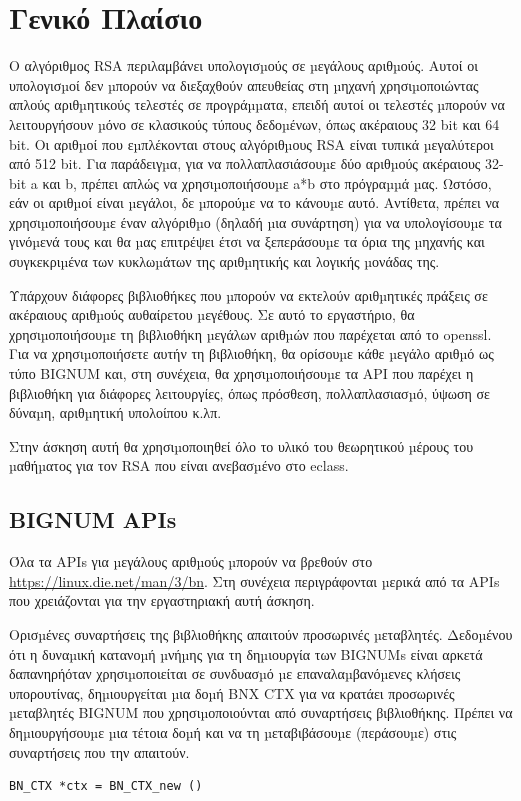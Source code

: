%
%
\setcounter{section}{1}
\section{Γενικό Πλαίσιο}


\noindent
Ο αλγόριθμος RSA περιλαμβάνει υπολογισµούς σε µεγάλους αριθµούς. Αυτοί οι υπολογισµοί
δεν µπορούν να διεξαχθούν απευθείας στη µηχανή χρησιµοποιώντας απλούς αριθµητικούς
τελεστές σε προγράµµατα, επειδή αυτοί οι τελεστές µπορούν να λειτουργήσουν µόνο σε
κλασικούς τύπους δεδοµένων, όπως ακέραιους 32 bit και 64 bit. Οι αριθµοί που εµπλέκονται
στους αλγόριθµους RSA είναι τυπικά µεγαλύτεροι από 512 bit. Για παράδειγµα, για να
πολλαπλασιάσουµε δύο αριθµούς ακέραιους 32-bit a και b, πρέπει απλώς να χρησιµοποιήσουµε
a*b στο πρόγραµµά µας. Ωστόσο, εάν οι αριθµοί είναι µεγάλοι, δε µπορούµε να το κάνουµε
αυτό. Αντίθετα, πρέπει να χρησιµοποιήσουµε έναν αλγόριθµο (δηλαδή µια συνάρτηση) για να
υπολογίσουµε τα γινόµενά τους και θα µας επιτρέψει έτσι να ξεπεράσουµε τα όρια της µηχανής
και συγκεκριµένα των κυκλωµάτων της αριθµητικής και λογικής µονάδας της.

\noindent
Υπάρχουν διάφορες βιβλιοθήκες που µπορούν να εκτελούν αριθµητικές πράξεις σε ακέραιους
αριθµούς αυθαίρετου µεγέθους. Σε αυτό το εργαστήριο, θα χρησιµοποιήσουµε τη βιβλιοθήκη
µεγάλων αριθµών που παρέχεται από το openssl. Για να χρησιµοποιήσετε αυτήν τη βιβλιοθήκη,
θα ορίσουµε κάθε µεγάλο αριθµό ως τύπο BIGNUM και, στη συνέχεια, θα χρησιµοποιήσουµε
τα API που παρέχει η βιβλιοθήκη για διάφορες λειτουργίες, όπως πρόσθεση, πολλαπλασιασµό,
ύψωση σε δύναµη, αριθµητική υπολοίπου κ.λπ.

\noindent
Στην άσκηση αυτή θα χρησιµοποιηθεί όλο το υλικό του θεωρητικού µέρους του µαθήµατος για
τον RSA που είναι ανεβασµένο στο eclass.

\subsection{BIGNUM APIs}
\noindent
Όλα τα APIs για µεγάλους αριθµούς µπορούν να βρεθούν στο\\ \url{https://linux.die.net/man/3/bn}. Στη συνέχεια περιγράφονται µερικά από τα APIs που χρειάζονται για την
εργαστηριακή αυτή άσκηση.

\noindent
Ορισµένες συναρτήσεις της βιβλιοθήκης απαιτούν προσωρινές µεταβλητές. Δεδοµένου ότι η
δυναµική κατανοµή µνήµης για τη δηµιουργία των BIGNUMs είναι αρκετά δαπανηρήόταν χρησιµοποιείται σε συνδυασµό µε επαναλαµβανόµενες κλήσεις υπορουτίνας,
δηµιουργείται µια δοµή BNX CTX για να κρατάει προσωρινές µεταβλητές BIGNUM που
χρησιµοποιούνται από συναρτήσεις βιβλιοθήκης. Πρέπει να δηµιουργήσουµε µια τέτοια
δοµή και να τη µεταβιβάσουµε (περάσουµε) στις συναρτήσεις που την απαιτούν.
\begin{center}
	\begin{lstlisting}	
BN_CTX *ctx = BN_CTX_new ()	
	\end{lstlisting}	
\end{center}

